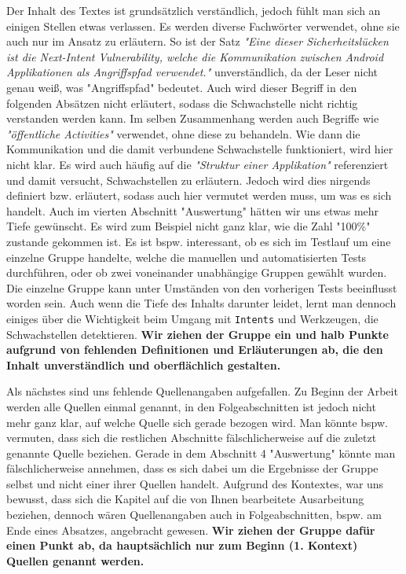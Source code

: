 \documentclass{article}
\begin{document}
  Der Inhalt des Textes ist grundsätzlich verständlich, jedoch fühlt man sich an
  einigen Stellen etwas verlassen. Es werden diverse Fachwörter verwendet, ohne
  sie auch nur im Ansatz zu erläutern. So ist der Satz \textit{"Eine dieser
  Sicherheitslücken ist die Next-Intent Vulnerability, welche die Kommunikation
  zwischen Android Applikationen als Angriffspfad verwendet."} unverständlich,
  da der Leser nicht genau weiß, was "Angriffspfad" bedeutet. Auch wird dieser
  Begriff in den folgenden Absätzen nicht erläutert, sodass die Schwachstelle
  nicht richtig verstanden werden kann. Im selben Zusammenhang werden auch
  Begriffe wie \textit{"öffentliche Activities"} verwendet, ohne diese zu
  behandeln. Wie dann die Kommunikation und die damit verbundene Schwachstelle
  funktioniert, wird hier nicht klar. Es wird auch häufig auf die
  \textit{"Struktur einer Applikation"} referenziert und damit versucht,
  Schwachstellen zu erläutern. Jedoch wird dies nirgends definiert bzw.
  erläutert, sodass auch hier vermutet werden muss, um was es sich handelt.
  Auch im vierten Abschnitt "Auswertung" hätten wir uns etwas mehr Tiefe
  gewünscht. Es wird zum Beispiel nicht ganz klar, wie die Zahl "100\%" zustande
  gekommen ist. Es ist bspw. interessant, ob es sich im Testlauf um eine einzelne
  Gruppe handelte, welche die manuellen und automatisierten Tests durchführen,
  oder ob zwei voneinander unabhängige Gruppen gewählt wurden. Die einzelne
  Gruppe kann unter Umständen von den vorherigen Tests beeinflusst worden sein.
  Auch wenn die Tiefe des Inhalts darunter leidet, lernt man dennoch einiges
  über die Wichtigkeit beim Umgang mit \texttt{Intents} und Werkzeugen, die
  Schwachstellen detektieren.  \textbf{Wir ziehen der Gruppe ein und halb Punkte
  aufgrund von fehlenden Definitionen und Erläuterungen ab, die den Inhalt
  unverständlich und oberflächlich gestalten.}

  Als nächstes sind uns fehlende Quellenangaben aufgefallen. Zu Beginn der
  Arbeit werden alle Quellen einmal genannt, in den Folgeabschnitten ist jedoch
  nicht mehr ganz klar, auf welche Quelle sich gerade bezogen wird. Man könnte
  bspw. vermuten, dass sich die restlichen Abschnitte fälschlicherweise auf die
  zuletzt genannte Quelle beziehen. Gerade in dem Abschnitt 4 "Auswertung"
  könnte man fälschlicherweise annehmen, dass es sich dabei um die Ergebnisse der 
 Gruppe selbst und nicht einer ihrer Quellen handelt. Aufgrund des Kontextes, war uns 
 bewusst, dass sich die Kapitel auf die von Ihnen bearbeitete Ausarbeitung beziehen, 
 dennoch wären Quellenangaben auch in Folgeabschnitten, bspw. am Ende eines Absatzes,
 angebracht gewesen. \textbf{Wir ziehen der Gruppe dafür einen Punkt ab, da hauptsächlich 
nur zum Beginn (1. Kontext) Quellen genannt werden.}
\end{document}
